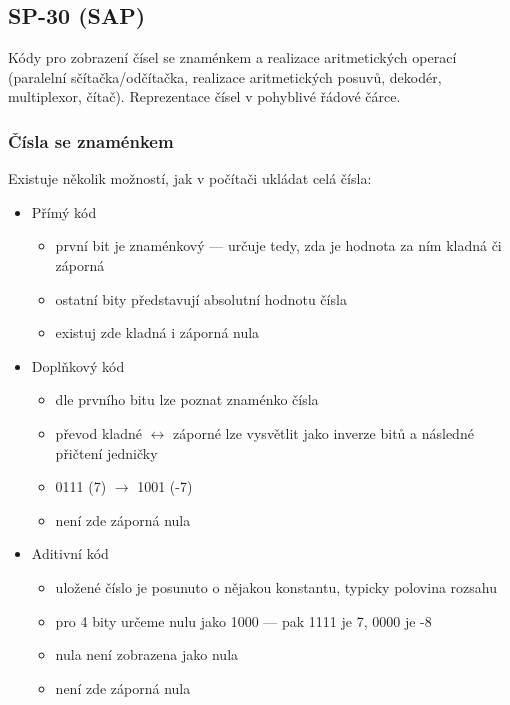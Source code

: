 \subsection{SP-30 (SAP)}
Kódy pro zobrazení čísel se znaménkem a realizace aritmetických operací (paralelní sčítačka/odčítačka, realizace aritmetických posuvů, dekodér, multiplexor, čítač). Reprezentace čísel v pohyblivé řádové čárce.

\subsubsection*{Čísla se znaménkem}
Existuje několik možností, jak v počítači ukládat celá čísla:
\begin{itemize}
	\item Přímý kód
	\begin{itemize}
		\item první bit je znaménkový --- určuje tedy, zda je hodnota za ním kladná či záporná
		\item ostatní bity představují absolutní hodnotu čísla
		\item existuj zde kladná i záporná nula
	\end{itemize}
	
	\item Doplňkový kód
	\begin{itemize}
		\item dle prvního bitu lze poznat znaménko čísla
		\item převod kladné $\leftrightarrow$ záporné lze vysvětlit jako inverze bitů a následné přičtení jedničky
		\item 0111 (7) $\rightarrow$ 1001 (-7)
		\item není zde záporná nula
	\end{itemize}
	\item Aditivní kód
	\begin{itemize}
		\item uložené číslo je posunuto o nějakou konstantu, typicky polovina rozsahu
		\item pro 4 bity určeme nulu jako 1000 --- pak 1111 je 7, 0000 je -8
		\item nula není zobrazena jako nula
		\item není zde záporná nula
	\end{itemize}
\end{itemize}

